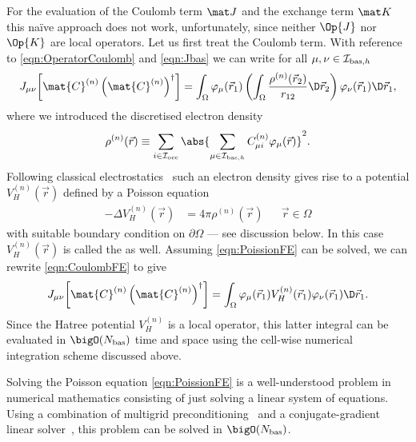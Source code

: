 For the evaluation of the Coulomb term $\matJ$
and the exchange term $\matK$ this na\"{i}ve approach does not work,
unfortunately, since neither $\Op{J}$ nor $\Op{K}$ are local operators.
Let us first treat the Coulomb term.
With reference to \eqref{eqn:OperatorCoulomb} and \eqref{eqn:Jbas}
we can write
for all $\mu, \nu \in \mathcal{I}_{\text{bas},h}$
\begin{equation}
	\label{eqn:CoulombFE}
	J_{\mu\nu}\!\left[\mat{C}^{(n)}
		\left(\mat{C}^{(n)}\right)^\dagger\right]
	= \int_\Omega \varphi_\mu(\vec{r}_1)
	\left(\int_\Omega \frac{\rho^{(n)}(\vec{r}_2)}
		{ r_{12} }\D \vec{r}_2 \right)
	\varphi_\nu(\vec{r}_1) \D \vec{r}_1,
\end{equation}
where we introduced the discretised electron density
\begin{equation}
	\rho^{(n)}(\vec{r}) \equiv \sum_{i\in\Iocc} \abs{\sum_{\mu\in\Ibash} C^{(n)}_{\mu i} \varphi_\mu(\vec{r})}^2.
	\label{eqn:ElectronDensityFE}
\end{equation}
Following classical electrostatics~\cite{Jackson1999}
such an electron density gives rise to a potential $V^{(n)}_H(\vec{r})$
defined by a Poisson equation
\begin{equation}
\label{eqn:PoissionFE}
\begin{aligned}
	-\Delta V^{(n)}_H(\vec{r}) &= 4\pi \rho^{(n)}(\vec{r}) &&\vec{r} \in \Omega
\end{aligned}
\end{equation}
with suitable boundary condition on $\partial\Omega$
--- see discussion below.
In this case $V^{(n)}_H(\vec{r})$ is called the  as well.
Assuming \eqref{eqn:PoissionFE} can be solved,
we can rewrite \eqref{eqn:CoulombFE} to give
\[
	J_{\mu\nu}\!\left[\mat{C}^{(n)}\left(\mat{C}^{(n)}\right)^\dagger\right]
	= \int_\Omega \varphi_\mu(\vec{r}_1) V^{(n)}_H(\vec{r}_1) \varphi_\nu(\vec{r}_1) \D \vec{r}_1.
\]
Since the Hatree potential $V^{(n)}_H$ is a local operator,
this latter integral can be evaluated in $\bigO(\Nbas)$
time and space using the cell-wise numerical integration scheme discussed above.

Solving the Poisson equation \eqref{eqn:PoissionFE}
is a well-understood problem in numerical mathematics
consisting of just solving a linear system of equations.
Using a combination of multigrid preconditioning~\cite{Hackbusch1985}
and a conjugate-gradient linear solver~\cite{Grossmann1992},
this problem can be solved in $\bigO(\Nbas)$.%

